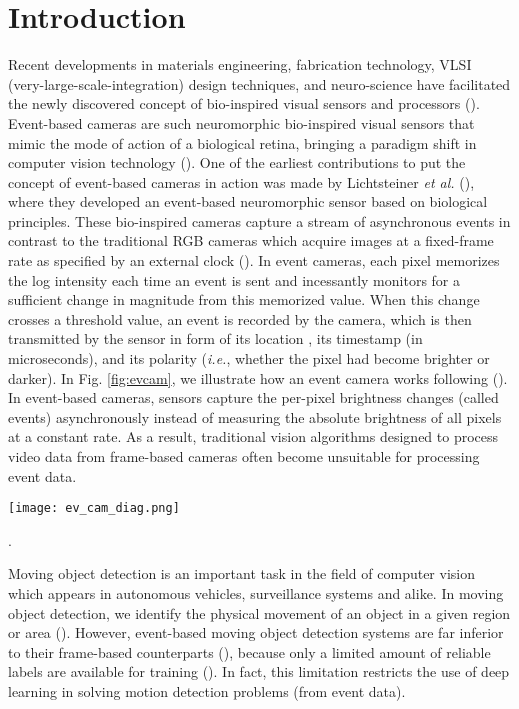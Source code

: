\documentclass{article}
\begin{document}
\section{Introduction}
Recent developments in materials engineering, fabrication technology, VLSI (very-large-scale-integration) design techniques, and neuro-science have facilitated the newly discovered concept of bio-inspired visual sensors and processors (\cite{chen2020event}). Event-based cameras are such neuromorphic bio-inspired visual sensors that mimic the mode of action of a biological retina, bringing a paradigm shift in computer vision technology (\cite{chen2020event}). One of the earliest contributions to put the concept of event-based cameras in action was made by Lichtsteiner \textit{et al.} (\cite{lichtsteiner2006128}), where they  developed an event-based neuromorphic sensor based on biological principles. These bio-inspired cameras capture a stream of asynchronous events in contrast to the traditional RGB cameras which acquire images at a fixed-frame rate as specified by an external clock (\cite{gallego2020event}). In event cameras, each pixel memorizes the log intensity each time an event is sent and incessantly monitors for a sufficient change in magnitude from this memorized value. When this change crosses a threshold value, an event is recorded by the camera, which is then transmitted by the sensor in form of its location , its timestamp  (in microseconds), and its polarity  (\textit{i.e.}, whether the pixel had become brighter or darker). In Fig. \ref{fig:evcam}, we illustrate how an event camera works following (\cite{gallego2020event}). In event-based cameras,  sensors capture the per-pixel brightness changes (called events) asynchronously instead of measuring the absolute brightness of all pixels at a constant rate. As a result, traditional vision algorithms designed to process video data from frame-based cameras often become unsuitable for processing event data. 

\begin{figure*}
\begin{center}
\texttt{[image: ev\_cam\_diag.png]}
\end{center}
   \caption{Visualization of the output from a neuromorphic vision sensor and a standard frame-based camera when facing a rotating disk with a black dot. Inspired by \cite{gallego2020event}}.
    \label{fig:evcam}
\label{fig:evcam}
\end{figure*}

Moving object detection is an important task in the field of computer vision which appears in autonomous vehicles, surveillance systems and alike. In moving object detection, we identify the physical movement of an object in a given region or area (\cite{kulchandani2015moving}). However, event-based moving object detection systems are far inferior to their frame-based counterparts (\cite{piccardi2004background,agarwal2016review}), because only a limited amount of reliable labels are available for training (\cite{bi2020graph}). In fact, this limitation restricts the use of deep learning in solving motion detection problems (from event data).   
\end{document}
